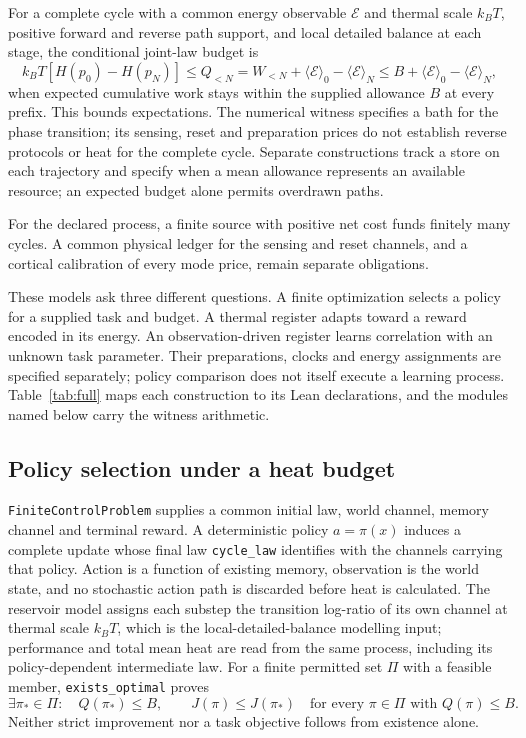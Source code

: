 \documentclass{article}
\begin{document}
For a complete cycle with a common energy observable $\mathcal{E}$ and
thermal scale $k_BT$, positive forward and reverse path support, and local
detailed balance at each stage, the conditional joint-law budget is
\begin{equation}
 k_BT[H(p_0)-H(p_N)]\leq Q_{<N}
 =W_{<N}+\langle \mathcal{E}\rangle_0-\langle \mathcal{E}\rangle_N
 \leq B+\langle \mathcal{E}\rangle_0-\langle \mathcal{E}\rangle_N,
 \label{eq:continuing-budget}
\end{equation}
when expected cumulative work stays within the supplied allowance $B$ at every prefix. This bounds expectations. The numerical witness specifies a bath for the phase transition; its sensing, reset and preparation prices do not establish reverse protocols or heat for the complete cycle. Separate constructions track a store on each trajectory and specify when a mean allowance represents an available resource; an expected budget alone permits overdrawn paths.

For the declared process, a finite source with positive net cost funds finitely
many cycles. A common physical ledger for the sensing and reset channels, and
a cortical calibration of every mode price, remain separate obligations.

These models ask three different questions. A finite optimization selects a policy for a supplied task and budget. A thermal register adapts toward a reward encoded in its energy. An observation-driven register learns correlation with an unknown task parameter. Their preparations, clocks and energy assignments are specified separately; policy comparison does not itself execute a learning process. Table~\ref{tab:full} maps each construction to its Lean declarations, and the modules named below carry the witness arithmetic.

\subsection{Policy selection under a heat budget}
\label{sec:supp-policy}

\texttt{FiniteControlProblem} supplies a common initial law, world channel,
memory channel and terminal reward. A deterministic policy $a=\pi(x)$ induces
a complete update whose final law \texttt{cycle\_law} identifies with the
channels carrying that policy. Action is a function of existing memory,
observation is the world state, and no stochastic action path is discarded
before heat is calculated. The reservoir model assigns each substep the
transition log-ratio of its own channel at thermal scale $k_BT$, which is the
local-detailed-balance modelling input; performance and total mean heat are
read from the same process, including its policy-dependent intermediate law.
For a finite permitted set $\Pi$ with a feasible member,
\texttt{exists\_optimal} proves
\begin{equation}
 \exists\pi_*\in\Pi:\quad Q(\pi_*)\le B,\qquad
 J(\pi)\le J(\pi_*)\quad\text{for every }\pi\in\Pi\text{ with }Q(\pi)\le B.
 \label{eq:finite-control}
\end{equation}
Neither strict improvement nor a task objective follows from existence alone.
\end{document}
